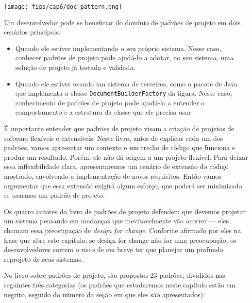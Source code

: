 \documentclass[
  11pt,
  twoside]{book}
\newcommand{\passthrough}[1]{#1}
\let\origfigure\figure
\let\endorigfigure\endfigure
\renewenvironment{figure}[1][2] {
    \expandafter\origfigure\expandafter[!h]
} {
    \endorigfigure
}
\begin{document}
\begin{figure}
\centering
\texttt{[image: figs/cap6/doc-pattern.png]}
\caption{Documentação de uma classe \passthrough{\lstinline!Factory!} da
API de Java}
\end{figure}

Um desenvolvedor pode se beneficiar do domínio de padrões de projeto em
dois cenários principais:

\begin{itemize}
\item
  Quando ele estiver implementando o seu próprio sistema. Nesse caso,
  conhecer padrões de projeto pode ajudá-lo a adotar, no seu sistema,
  uma solução de projeto já testada e validada.
\item
  Quando ele estiver usando um sistema de terceiros, como o pacote de
  Java que implementa a classe
  \passthrough{\lstinline!DocumentBuilderFactory!} da figura. Nesse
  caso, conhecimento de padrões de projeto pode ajudá-lo a entender o
  comportamento e a estrutura da classe que ele precisa usar.
\end{itemize}

É importante entender que padrões de projeto visam a criação de projetos
de software flexíveis e extensíveis. Neste livro, antes de explicar cada
um dos padrões, vamos apresentar um contexto e um trecho de código que
funciona e produz um resultado. Porém, ele não dá origem a um projeto
flexível. Para deixar essa inflexibilidade clara, apresentaremos um
cenário de extensão do código mostrado, envolvendo a implementação de
novos requisitos. Então vamos argumentar que essa extensão exigirá algum
esforço, que poderá ser minimizado se usarmos um padrão de projeto.

 Os quatro autores do livro de padrões de
projeto defendem que devemos projetar um sistema pensando em mudanças
que inevitavelmente vão ocorrer --- eles chamam essa preocupação de
\emph{design for change}. Conforme afirmado por eles na frase que abre
este capítulo, se design for change não for uma preocupação, os
desenvolvedores correm o risco de em breve ter que planejar um profundo
reprojeto de seus sistemas.

No livro sobre padrões de projeto, são propostos 23 padrões, divididos
nas seguintes três categorias (os padrões que estudaremos neste capítulo
estão em negrito, seguido do número da seção em que eles são
apresentados):
\end{document}
